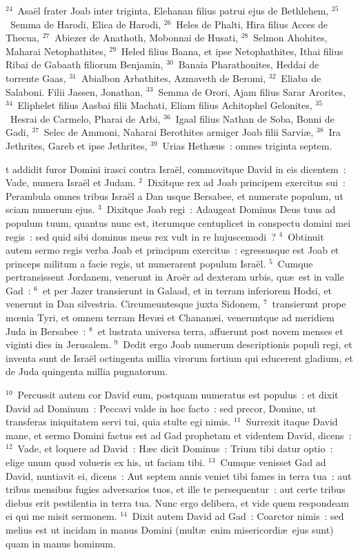 ${}^{24}$~Asa\"el frater Joab inter triginta, Elehanan filius patrui ejus de Bethlehem,
${}^{25}$~Semma de Harodi, Elica de Harodi,
${}^{26}$~Heles de Phalti, Hira filius Acces de Thecua,
${}^{27}$~Abiezer de Anathoth, Mobonnai de Husati,
${}^{28}$~Selmon Ahohites, Maharai Netophathites,
${}^{29}$~Heled filius Baana, et ipse Netophathites, Ithai filius Ribai de Gabaath filiorum Benjamin,
${}^{30}$~Banaia Pharathonites, Heddai de torrente Gaas,
${}^{31}$~Abialbon Arbathites, Azmaveth de Beromi,
${}^{32}$~Eliaba de Salaboni. Filii Jassen, Jonathan,
${}^{33}$~Semma de Orori, Ajam filius Sarar Arorites,
${}^{34}$~Eliphelet filius Aasbai filii Machati, Eliam filius Achitophel Gelonites,
${}^{35}$~Hesrai de Carmelo, Pharai de Arbi,
${}^{36}$~Igaal filius Nathan de Soba, Bonni de Gadi,
${}^{37}$~Selec de Ammoni, Naharai Berothites armiger Joab filii Sarvi\ae ,
${}^{38}$~Ira Jethrites, Gareb et ipse Jethrites,
${}^{39}$~Urias Heth\ae us~: omnes triginta septem.

\bchapter
{}t addidit furor Domini irasci contra Isra\"el, commovitque David in eis dicentem~: Vade, numera Isra\"el et Judam.
${}^{2}$~Dixitque rex ad Joab principem exercitus sui~: Perambula omnes tribus Isra\"el a Dan usque Bersabee, et numerate populum, ut sciam numerum ejus.
${}^{3}$~Dixitque Joab regi~: Adaugeat Dominus Deus tuus ad populum tuum, quantus nunc est, iterumque centuplicet in conspectu domini mei regis~: sed quid sibi dominus meus rex vult in re hujuscemodi~?
${}^{4}$~Obtinuit autem sermo regis verba Joab et principum exercitus~: egressusque est Joab et princeps militum a facie regis, ut numerarent populum Isra\"el.
${}^{5}$~Cumque pertransissent Jordanem, venerunt in Aro\"er ad dexteram urbis, qu\ae\ est in valle Gad~:
${}^{6}$~et per Jazer transierunt in Galaad, et in terram inferiorem Hodsi, et venerunt in Dan silvestria. Circumeuntesque juxta Sidonem,
${}^{7}$~transierunt prope mœnia Tyri, et omnem terram Hev\ae i et Chanan\ae i, veneruntque ad meridiem Juda in Bersabee~:
${}^{8}$~et lustrata universa terra, affuerunt post novem menses et viginti dies in Jerusalem.
${}^{9}$~Dedit ergo Joab numerum descriptionis populi regi, et inventa sunt de Isra\"el octingenta millia virorum fortium qui educerent gladium, et de Juda quingenta millia pugnatorum.


${}^{10}$~Percussit autem cor David eum, postquam numeratus est populus~: et dixit David ad Dominum~: Peccavi valde in hoc facto~: sed precor, Domine, ut transferas iniquitatem servi tui, quia stulte egi nimis.
${}^{11}$~Surrexit itaque David mane, et sermo Domini factus est ad Gad prophetam et videntem David, dicens~:
${}^{12}$~Vade, et loquere ad David~: H\ae c dicit Dominus~: Trium tibi datur optio~: elige unum quod volueris ex his, ut faciam tibi.
${}^{13}$~Cumque venisset Gad ad David, nuntiavit ei, dicens~: Aut septem annis veniet tibi fames in terra tua~: aut tribus mensibus fugies adversarios tuos, et ille te persequentur~: aut certe tribus diebus erit pestilentia in terra tua. Nunc ergo delibera, et vide quem respondeam ei qui me misit sermonem.
${}^{14}$~Dixit autem David ad Gad~: Coarctor nimis~: sed melius est ut incidam in manus Domini (mult\ae\ enim misericordi\ae\ ejus sunt) quam in manus hominum.


